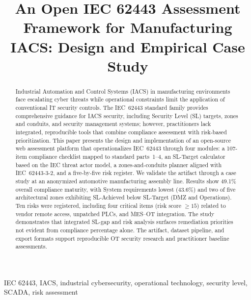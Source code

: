 \documentclass[conference]{IEEEtran}
\begin{document}
\title{An Open IEC 62443 Assessment Framework for Manufacturing IACS: Design and Empirical Case Study}

\author{
}

\maketitle

\begin{abstract}
Industrial Automation and Control Systems (IACS) in manufacturing environments face escalating cyber threats while operational constraints limit the application of conventional IT security controls. The IEC~62443 standard family provides comprehensive guidance for IACS security, including Security Level (SL) targets, zones and conduits, and security management systems; however, practitioners lack integrated, reproducible tools that combine compliance assessment with risk-based prioritization. This paper presents the design and implementation of an open-source web assessment platform that operationalizes IEC~62443 through four modules: a 107-item compliance checklist mapped to standard parts~1--4, an SL-Target calculator based on the IEC threat actor model, a zones-and-conduits planner aligned with IEC~62443-3-2, and a five-by-five risk register. We validate the artifact through a case study at an anonymized automotive manufacturing assembly line. Results show 49.1\% overall compliance maturity, with System requirements lowest (43.6\%) and two of five architectural zones exhibiting SL-Achieved below SL-Target (DMZ and Operations). Ten risks were registered, including four critical items (risk score $\geq 15$) related to vendor remote access, unpatched PLCs, and MES--OT integration. The study demonstrates that integrated SL-gap and risk analysis surfaces remediation priorities not evident from compliance percentage alone. The artifact, dataset pipeline, and export formats support reproducible OT security research and practitioner baseline assessments.
\end{abstract}

\begin{IEEEkeywords}
IEC 62443, IACS, industrial cybersecurity, operational technology, security level, SCADA, risk assessment
\end{IEEEkeywords}
\end{document}
